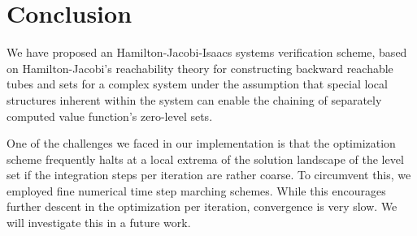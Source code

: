 \section{Conclusion}
\label{sec:conclude}
%
We have proposed an Hamilton-Jacobi-Isaacs systems verification scheme, based on Hamilton-Jacobi's reachability theory for constructing backward reachable tubes and sets for a complex system under the assumption that special local structures inherent within the system can enable the chaining of separately computed value function's zero-level sets. 

One of the challenges we faced in our implementation is that the optimization scheme frequently halts at a local extrema of the solution landscape of the level set if the integration steps per iteration are rather coarse. To circumvent this, we employed fine numerical time step marching schemes. While this encourages further descent in the optimization per iteration, convergence is very slow. We will investigate this in a future work. 